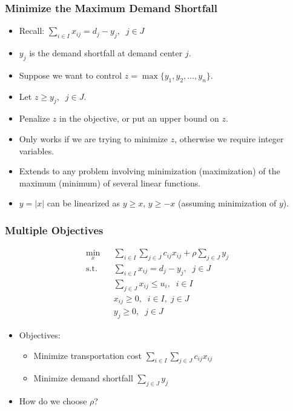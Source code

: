 \documentclass[12pt,handout]{beamer}
\begin{document}
\begin{frame}
\frametitle{Minimize the Maximum Demand Shortfall}
\begin{itemize}
\item Recall: $\sum_{i \in I} x_{ij} = d_j - y_j,\;\;j \in J$
\item $y_j$ is the demand shortfall at demand center $j$.
\item Suppose we want to control $z = \max \{y_1, y_2, \ldots, y_n\}$.
\item Let $z \ge y_j,\;\;j \in J$.
\item Penalize $z$ in the objective, or put an upper bound on $z$.
\item Only works if we are trying to minimize $z$, otherwise we require integer variables.
\item Extends to any problem involving minimization (maximization) of the maximum (minimum) of several linear functions.
\item $y = |x|$ can be linearized as $y \ge x$, $y \ge -x$ (assuming minimization of $y$).
\end{itemize}
\end{frame}

\begin{frame}
\frametitle{Multiple Objectives}
\begin{eqnarray}
\min_{x} && \sum_{i \in I} \sum_{j \in J} c_{ij} x_{ij} + \rho \sum_{j \in J} y_j \nonumber \\
\mbox{s.t.} && \sum_{i \in I} x_{ij} = d_j - y_j,\;\;j \in J \nonumber \\
&& \sum_{j \in J} x_{ij} \le u_i,\;\;i \in I \nonumber \\
&& x_{ij} \ge 0, \;\;i \in I,\;j \in J \nonumber \\
&& y_j \ge 0,\;\;j \in J \nonumber
\end{eqnarray}
\begin{itemize}
\item Objectives:
    \begin{itemize}
    \item Minimize transportation cost $\sum_{i \in I} \sum_{j \in J} c_{ij} x_{ij}$
    \item Minimize demand shortfall $\sum_{j \in J} y_j$
    \end{itemize}
\item How do we choose $\rho$?
\end{itemize}
\end{frame}
\end{document}
